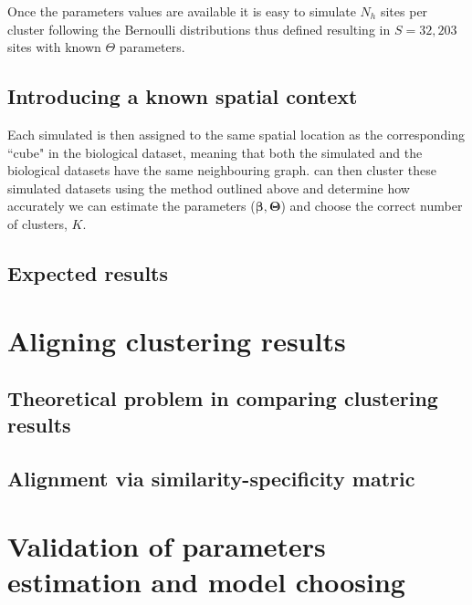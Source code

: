 	Once the parameters values are available it is easy to simulate $N_h$ sites per cluster following the Bernoulli distributions thus defined resulting in $S=32,203$ sites with known $\Theta$ parameters.
	\subsection{Introducing a known spatial context}\label{subsec:simul_spatial}
	Each simulated is then assigned to the same spatial location as the corresponding ``cube" in the biological dataset, meaning that both the simulated and the biological datasets have the same neighbouring graph. can then cluster these simulated datasets using the method outlined above and determine how accurately we can estimate the parameters ($\mathbf{\beta}, \mathbf{\Theta}$) and choose the correct number of clusters, $K$.\\ 
	\subsection{Expected results}\label{subsec:expected_simul_results}

\section{Aligning clustering results }
	\subsection{Theoretical problem in comparing clustering results}
	\subsection{Alignment via similarity-specificity matric}

\section{Validation of parameters estimation and model choosing}

